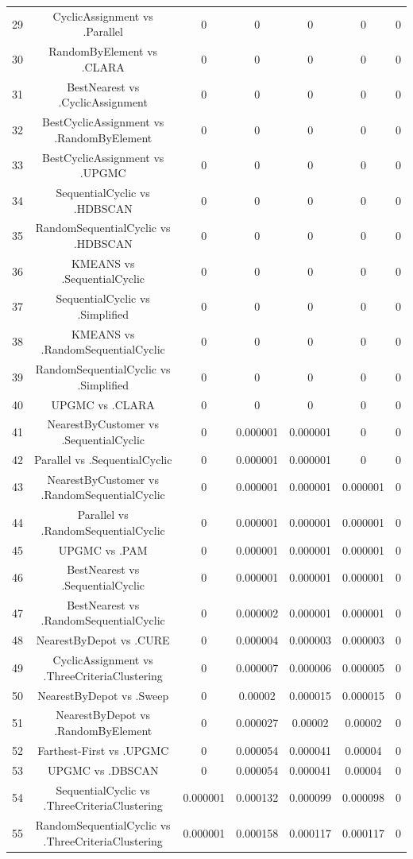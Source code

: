 \documentclass[a4paper,10pt]{article}
\begin{document}
\begin{landscape}
\begin{table}[!htp]
\begin{tabular}{ccccccc}
29&CyclicAssignment vs .Parallel&0&0&0&0&0\\
30&RandomByElement vs .CLARA&0&0&0&0&0\\
31&BestNearest vs .CyclicAssignment&0&0&0&0&0\\
32&BestCyclicAssignment vs .RandomByElement&0&0&0&0&0\\
33&BestCyclicAssignment vs .UPGMC&0&0&0&0&0\\
34&SequentialCyclic vs .HDBSCAN&0&0&0&0&0\\
35&RandomSequentialCyclic vs .HDBSCAN&0&0&0&0&0\\
36&KMEANS vs .SequentialCyclic&0&0&0&0&0\\
37&SequentialCyclic vs .Simplified&0&0&0&0&0\\
38&KMEANS vs .RandomSequentialCyclic&0&0&0&0&0\\
39&RandomSequentialCyclic vs .Simplified&0&0&0&0&0\\
40&UPGMC vs .CLARA&0&0&0&0&0\\
41&NearestByCustomer vs .SequentialCyclic&0&0.000001&0.000001&0&0\\
42&Parallel vs .SequentialCyclic&0&0.000001&0.000001&0&0\\
43&NearestByCustomer vs .RandomSequentialCyclic&0&0.000001&0.000001&0.000001&0\\
44&Parallel vs .RandomSequentialCyclic&0&0.000001&0.000001&0.000001&0\\
45&UPGMC vs .PAM&0&0.000001&0.000001&0.000001&0\\
46&BestNearest vs .SequentialCyclic&0&0.000001&0.000001&0.000001&0\\
47&BestNearest vs .RandomSequentialCyclic&0&0.000002&0.000001&0.000001&0\\
48&NearestByDepot vs .CURE&0&0.000004&0.000003&0.000003&0\\
49&CyclicAssignment vs .ThreeCriteriaClustering&0&0.000007&0.000006&0.000005&0\\
50&NearestByDepot vs .Sweep&0&0.00002&0.000015&0.000015&0\\
51&NearestByDepot vs .RandomByElement&0&0.000027&0.00002&0.00002&0\\
52&Farthest-First vs .UPGMC&0&0.000054&0.000041&0.00004&0\\
53&UPGMC vs .DBSCAN&0&0.000054&0.000041&0.00004&0\\
54&SequentialCyclic vs .ThreeCriteriaClustering&0.000001&0.000132&0.000099&0.000098&0\\
55&RandomSequentialCyclic vs .ThreeCriteriaClustering&0.000001&0.000158&0.000117&0.000117&0\\

\end{tabular}
\end{table}
\end{landscape}
\end{document}

